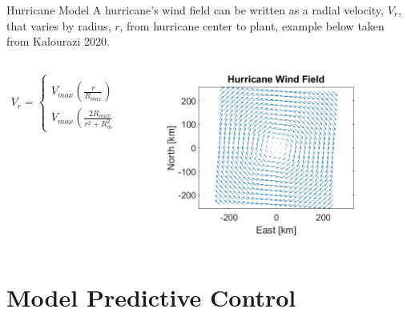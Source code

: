 \documentclass[aspectratio=169]{beamer}
\begin{document}
\begin{frame}{Hurricane Model}
A hurricane's wind field can be written as a radial velocity, $V_r$, that varies by radius, $r$, from hurricane center to plant, example below taken from Kalourazi 2020.
    \begin{columns}
    \begin{column}{0.55\textwidth}
        \begin{align}
        V_r = 
        \begin{cases}
                V_{max} \left(\frac{r}{R_{max}}\right)^{\frac{3}{2}}, & r <
                R_{max} \\
                V_{max} \left( \frac{2 R_{max} r}{r^2 + R_{max}^2} \right), & r \geq R_{max} 
        \end{cases}
        \end{align}
        \end{column}
        \begin{column}{0.45\textwidth}
            \begin{figure}
            \centering
            \includegraphics[width=1\textwidth]{HurricaneWindField.jpg}
        \end{figure}
        \end{column}
    \end{columns}
\end{frame}

\section{Model Predictive Control}
\end{document}
